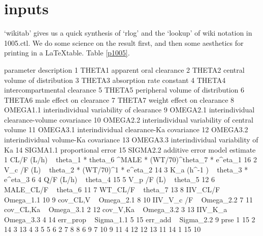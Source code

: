 \section{inputs}
`wikitab' gives us a quick synthesis of `rlog' and the `lookup' of wiki notation in 1005.ctl.
We do some science on the result first, and then some aesthetics for printing in a \LaTeX table.  Table \ref{p1005}.
\begin{Schunk}
\begin{Soutput}
   parameter                                   description
1     THETA1                       apparent oral clearance
2     THETA2                central volume of distribution
3     THETA3                      absorption rate constant
4     THETA4                  intercompartmental clearance
5     THETA5             peripheral volume of distribution
6     THETA6                      male effect on clearance
7     THETA7                    weight effect on clearance
8   OMEGA1.1      interindividual variability of clearance
9   OMEGA2.1   interindividual clearance-volume covariance
10  OMEGA2.2 interindividual variability of central volume
11  OMEGA3.1       interindividual clearance-Ka covariance
12  OMEGA3.2          interindividual volume-Ka covariance
13  OMEGA3.3             interindividual variability of Ka
14  SIGMA1.1                            proportional error
15  SIGMA2.2                                additive error
                                                                model estimate
1  CL/F (L/h) ~ theta_1 *  theta_6 ^MALE * (WT/70)^theta_7  * e^eta_1       16
2                          V_c /F (L) ~ theta_2 * (WT/70)^1 * e^eta_2       14
3                                     K_a (h^-1 ) ~ theta_3 * e^eta_3        6
4                                                 Q/F (L/h) ~ theta_4       15
5                                                V_p /F (L) ~ theta_5       12
6                                                 MALE_CL/F ~ theta_6       11
7                                                   WT_CL/F ~ theta_7       13
8                                                IIV_CL/F ~ Omega_1.1       10
9                                                cov_CL,V ~ Omega_2.1        8
10                                             IIV_V_c /F ~ Omega_2.2        7
11                                             cov_CL,Ka  ~ Omega_3.1        2
12                                              cov_V,Ka  ~ Omega_3.2        3
13                                               IIV_K_a  ~ Omega_3.3        4
14                                               err_prop ~ Sigma_1.1        5
15                                                err_add ~ Sigma_2.2        9
   prse
1    15
2    14
3    13
4     3
5     5
6     2
7     8
8     6
9     7
10    9
11    4
12   12
13   11
14    1
15   10
\end{Soutput}
\end{Schunk}

